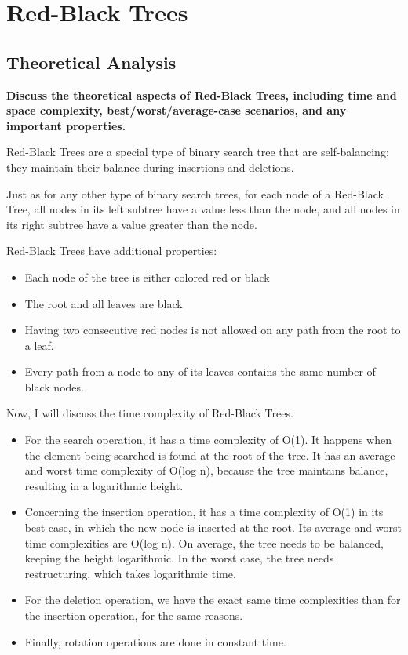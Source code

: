 \documentclass[12pt]{amsart}
\begin{document}
\section{Red-Black Trees}

\subsection{Theoretical Analysis}

    \textbf{Discuss the theoretical aspects of Red-Black Trees, including time and space
	complexity, best/worst/average-case scenarios, and any important properties.}
	
	Red-Black Trees are a special type of binary search tree that are self-balancing: they maintain their balance
    during insertions and deletions.
    
    Just as for any other type of binary search trees, for each node of a Red-Black Tree, all nodes in its left subtree have a value less than the node, and all nodes in its right subtree have a value greater than the node.
    
    Red-Black Trees have additional properties:
    
    \begin{itemize}
    	\item Each node of the tree is either colored red or black
    	\item The root and all leaves are black
    	\item Having two consecutive red nodes is not allowed on any path from the root to a leaf.
    	\item Every path from a node to any of its leaves contains the same number of black nodes.
    \end{itemize}
    
    Now, I will discuss the time complexity of Red-Black Trees.
    
    \begin{itemize}
    	\item For the search operation, it has a time complexity of O(1). It happens when the element being searched is found at the root of the tree.
    	It has an average and worst time complexity of O(log n), because the tree maintains balance, resulting in a logarithmic height.
    	
    	\item Concerning the insertion operation, it has a time complexity of O(1) in its best case, in which the new node is inserted at the root.
    	Its average and worst time complexities are O(log n). On average, the tree needs to be balanced, keeping the height logarithmic.
    	In the worst case, the tree needs restructuring, which takes logarithmic time.
    	
    	\item For the deletion operation, we have the exact same time complexities than for the insertion operation, for the same reasons.
    	
    	\item Finally, rotation operations are done in constant time.
    \end{itemize}
    
\end{document}
